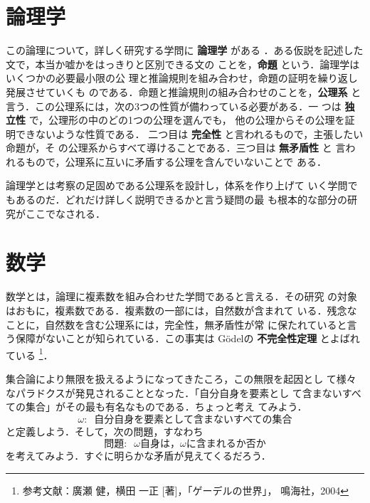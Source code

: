         \section{論理学}
            この論理について，詳しく研究する学問に \textbf{論理学} がある
            ．ある仮説を記述した文で，本当か嘘かをはっきりと区別できる文の
            ことを，\textbf{命題} という．論理学はいくつかの必要最小限の公
            理と推論規則を組み合わせ，命題の証明を繰り返し発展させていくも
            のである．命題と推論規則の組み合わせのことを，\textbf{公理系} と
            言う．この公理系には，次の3つの性質が備わっている必要がある．一
            つは \textbf{独立性} で，公理形の中のどの1つの公理を選んでも，
            他の公理からその公理を証明できないような性質である．
            二つ目は \textbf{完全性} と言われるもので，主張したい命題が，そ
            の公理系からすべて導けることである．三つ目は \textbf{無矛盾性} と
            言われるもので，公理系に互いに矛盾する公理を含んでいないことで
            ある．

            論理学とは考察の足固めである公理系を設計し，体系を作り上げて
            いく学問でもあるのだ．どれだけ詳しく説明できるかと言う疑問の最
            も根本的な部分の研究がここでなされる．



        \section{数学}
            数学とは，論理に複素数を組み合わせた学問であると言える．その研究
            の対象はおもに，複素数である．複素数の一部には，自然数が含まれて
            いる．残念なことに，自然数を含む公理系には，完全性，無矛盾性が常
            に保たれていると言う保障がないことが知られている．この事実は
            G\"{o}delの \textbf{不完全性定理} とよばれている
                \footnote{
                    参考文献：廣瀬 健，横田 一正 [著]，「ゲーデルの世界」，
                    鳴海社，2004
                }．

            集合論により無限を扱えるようになってきたころ，この無限を起因とし
            て様々なパラドクスが発見されることとなった．「自分自身を要素とし
            て含まないすべての集合」がその最も有名なものである．ちょっと考え
            てみよう．
                \begin{equation*}
                    \omega:\;\;\mbox{自分自身を要素として含まないすべての集合}
                \end{equation*}
            と定義しよう．そして，次の問題，すなわち
                \begin{equation*}
                    \mbox{問題}:\;\;\omega \mbox{自身は，} \omega \mbox{に含まれるか否か}
                \end{equation*}
            を考えてみよう．すぐに明らかな矛盾が見えてくるだろう．

